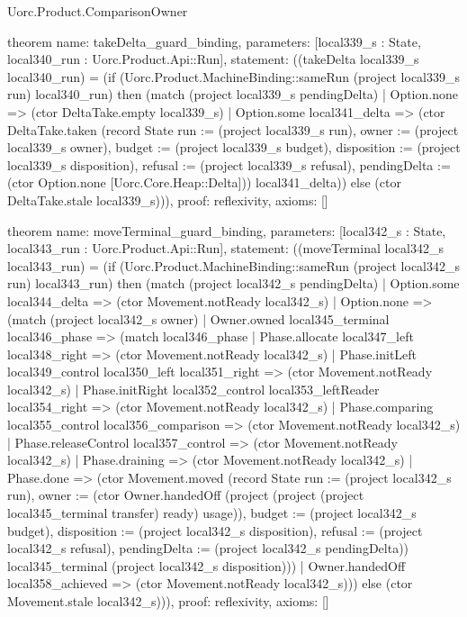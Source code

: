 \begin{lexlean}{Uorc.Product.ComparisonOwner}
\begin{semanticmodule}
theorem{
  name: takeDelta_guard_binding,
  parameters: [local339_s : State, local340_run : Uorc.Product.Api::Run],
  statement: ((takeDelta local339_s local340_run) = (if (Uorc.Product.MachineBinding::sameRun (project local339_s run) local340_run) then (match (project local339_s pendingDelta)
    | Option.none => (ctor DeltaTake.empty local339_s)
    | Option.some local341_delta => (ctor DeltaTake.taken (record State {run := (project local339_s run), owner := (project local339_s owner), budget := (project local339_s budget), disposition := (project local339_s disposition), refusal := (project local339_s refusal), pendingDelta := (ctor Option.none [Uorc.Core.Heap::Delta])}) local341_delta)) else (ctor DeltaTake.stale local339_s))),
  proof: reflexivity{},
  axioms: []
}

theorem{
  name: moveTerminal_guard_binding,
  parameters: [local342_s : State, local343_run : Uorc.Product.Api::Run],
  statement: ((moveTerminal local342_s local343_run) = (if (Uorc.Product.MachineBinding::sameRun (project local342_s run) local343_run) then (match (project local342_s pendingDelta)
    | Option.some local344_delta => (ctor Movement.notReady local342_s)
    | Option.none => (match (project local342_s owner)
      | Owner.owned local345_terminal local346_phase => (match local346_phase
        | Phase.allocate local347_left local348_right => (ctor Movement.notReady local342_s)
        | Phase.initLeft local349_control local350_left local351_right => (ctor Movement.notReady local342_s)
        | Phase.initRight local352_control local353_leftReader local354_right => (ctor Movement.notReady local342_s)
        | Phase.comparing local355_control local356_comparison => (ctor Movement.notReady local342_s)
        | Phase.releaseControl local357_control => (ctor Movement.notReady local342_s)
        | Phase.draining => (ctor Movement.notReady local342_s)
        | Phase.done => (ctor Movement.moved (record State {run := (project local342_s run), owner := (ctor Owner.handedOff (project (project (project local345_terminal transfer) ready) usage)), budget := (project local342_s budget), disposition := (project local342_s disposition), refusal := (project local342_s refusal), pendingDelta := (project local342_s pendingDelta)}) local345_terminal (project local342_s disposition)))
      | Owner.handedOff local358_achieved => (ctor Movement.notReady local342_s))) else (ctor Movement.stale local342_s))),
  proof: reflexivity{},
  axioms: []
}
\end{semanticmodule}
\end{lexlean}
